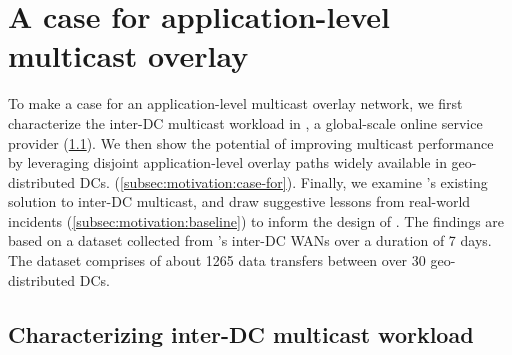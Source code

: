 \section{A case for application-level multicast overlay}
\label{sec:motivation}


To make a case for an
application-level multicast overlay network,
we first characterize the inter-DC multicast workload in
\company, a global-scale online service provider
(\Section\ref{subsec:motivation:multicast-traffic}).
We then show the potential of improving multicast performance
by leveraging disjoint application-level overlay paths
widely available in geo-distributed DCs.
(\Section\ref{subsec:motivation:case-for}).
Finally, we examine \company's existing solution to
inter-DC multicast, and draw suggestive lessons from real-world
incidents (\Section\ref{subsec:motivation:baseline})
to inform the design of \name.
The findings are based on a dataset collected from \company's
inter-DC WANs over a duration of 7 days.
The dataset comprises of about 1265 data transfers
between over 30 geo-distributed DCs.




\subsection{Characterizing inter-DC multicast workload}
\label{subsec:motivation:multicast-traffic}


